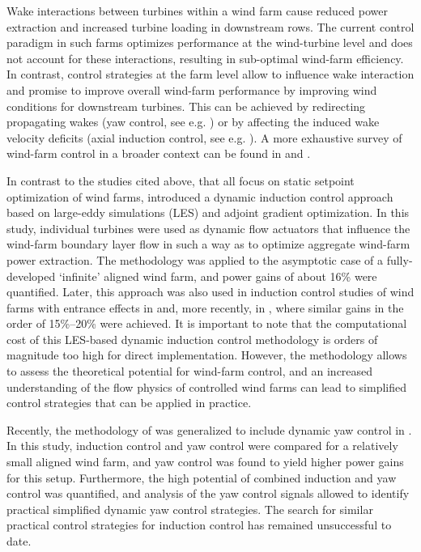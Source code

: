 \documentclass[wes, manuscript]{copernicus}
\begin{document}


\introduction  %
Wake interactions between turbines within a wind farm cause reduced power extraction and increased turbine loading in downstream rows. The current control paradigm in such farms optimizes performance at the wind-turbine level and does not account for these interactions, resulting in sub-optimal wind-farm efficiency. In contrast, control strategies at the farm level allow to influence wake interaction and promise to improve overall wind-farm performance by improving wind conditions for downstream turbines. This can be achieved by redirecting propagating wakes (yaw control, see e.g. \citealp{fleming2014evaluating, gebraad2016wind, campagnolo2016wind}) or by affecting the induced wake velocity deficits (axial induction control, see e.g. \citealp{nilsson2015large, annoni2016analysis, bartl2016experimental}). A more exhaustive survey of wind-farm control in a broader context can be found in \cite{knudsen2015survey} and \cite{boersma2017tutorial}. 

In contrast to the studies cited above, that all focus on static setpoint optimization of wind farms, \cite{goit2015optimal} introduced a dynamic induction control approach based on large-eddy simulations (LES) and adjoint gradient optimization. In this study, individual turbines were used as dynamic flow actuators that influence the wind-farm boundary layer flow in such a way as to optimize aggregate wind-farm power extraction. The methodology was applied to the asymptotic case of a fully-developed `infinite' aligned wind farm, and power gains of about 16\% were quantified. Later, this approach was also used in induction control studies of wind farms with entrance effects in \cite{goit2016optimal} and, more recently, in \cite{munters2017optimal}, where similar gains in the order of 15\%--20\% were achieved. 
It is important to note that the computational cost of this LES-based dynamic induction control methodology is orders of magnitude too high for direct implementation. However, the methodology allows to assess the theoretical potential for wind-farm control, and an increased understanding of the flow physics of controlled wind farms can lead to simplified control strategies that can be applied in practice.  

Recently, the methodology of \cite{goit2015optimal} was generalized to include dynamic yaw control in \cite{munters2018dynamic}. In this study, induction control and yaw control were compared for a relatively small aligned wind farm, and yaw control was found to yield higher power gains for this setup. Furthermore, the high potential of combined induction and yaw control was quantified, and analysis of the yaw control signals allowed to identify practical simplified dynamic yaw control strategies. The search for similar practical control strategies for induction control has remained unsuccessful to date. 
\end{document}
